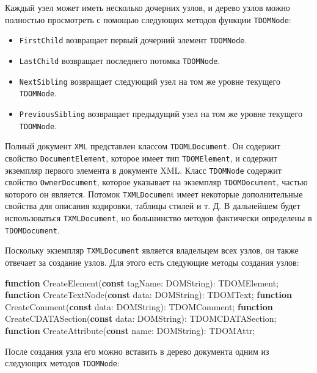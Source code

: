 \documentclass[
]{article}
\newenvironment{Shaded}{}{}
\newcommand{\KeywordTok}[1]{\textcolor[rgb]{0.00,0.44,0.13}{\textbf{#1}}}
\newcommand{\NormalTok}[1]{#1}
\begin{document}
Каждый узел может иметь несколько дочерних узлов, и дерево узлов можно
полностью просмотреть с помощью следующих методов функции
\texttt{TDOMNode}:

\begin{itemize}
\item
  \texttt{FirstChild} возвращает первый дочерний элемент
  \texttt{TDOMNode}.
\item
  \texttt{LastChild} возвращает последнего потомка \texttt{TDOMNode}.
\item
  \texttt{NextSibling} возвращает следующий узел на том же уровне
  текущего \texttt{TDOMNode}.
\item
  \texttt{PreviousSibling} возвращает предыдущий узел на том же уровне
  текущего \texttt{TDOMNode}.
\end{itemize}

Полный документ \texttt{XML} представлен классом \texttt{TDOMLDocument}.
Он содержит свойство \texttt{DocumentElement}, которое имеет тип
\texttt{TDOMElement}, и содержит экземпляр первого элемента в документе
XML. Класс \texttt{TDOMNode} содержит свойство \texttt{OwnerDocument},
которое указывает на экземпляр \texttt{TDOMDocument}, частью которого он
является. Потомок \texttt{TXMLDocumen}t имеет некоторые дополнительные
свойства для описания кодировки, таблицы стилей и т. Д. В дальнейшем
будет использоваться \texttt{TXMLDocument}, но большинство методов
фактически определены в \texttt{TDOMDocument}.

Поскольку экземпляр \texttt{TXMLDocument} является владельцем всех
узлов, он также отвечает за создание узлов. Для этого есть следующие
методы создания узлов:

\begin{Shaded}
\begin{Highlighting}[]
\KeywordTok{function}\NormalTok{ CreateElement(}\KeywordTok{const}\NormalTok{ tagName: DOMString): TDOMElement; }
\KeywordTok{function}\NormalTok{ CreateTextNode(}\KeywordTok{const}\NormalTok{ data: DOMString): TDOMText; }
\KeywordTok{function}\NormalTok{ CreateComment(}\KeywordTok{const}\NormalTok{ data: DOMString): TDOMComment; }
\KeywordTok{function}\NormalTok{ CreateCDATASection(}\KeywordTok{const}\NormalTok{ data: DOMString): TDOMCDATASection; }
\KeywordTok{function}\NormalTok{ CreateAttribute(}\KeywordTok{const}\NormalTok{ name: DOMString): TDOMAttr;}
\end{Highlighting}
\end{Shaded}

После создания узла его можно вставить в дерево документа одним из
следующих методов \texttt{TDOMNode}:
\end{document}
